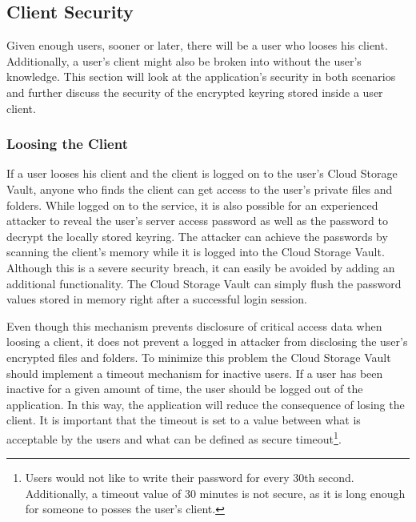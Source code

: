 \documentclass[pdftex,english,10pt,b5paper,twoside]{book}
\begin{document}
\subsection{Client Security}
Given enough users, sooner or later, there will be a user who looses his client.
Additionally, a user's client might also be broken into without the user's
knowledge. This section will look at the application's security in both
scenarios and further discuss the security of the encrypted keyring stored
inside a user client.

\subsubsection{Loosing the Client}
If a user looses his client and the client is logged on to the user's Cloud
Storage Vault, anyone who finds the client can get access to the user's private
files and folders. While logged on to the service, it is also possible for an
experienced attacker to reveal the user's server access password as well as the
password to decrypt the locally stored keyring. The attacker can achieve the passwords by
scanning the client's memory while it is logged into the Cloud Storage Vault.
Although this is a severe security breach, it can easily be avoided by adding an
additional functionality. The Cloud Storage Vault can simply flush the password
values stored in memory right after a successful login session.

Even though this mechanism prevents disclosure of critical access data when
loosing a client, it does not prevent a logged in attacker from disclosing the
user's encrypted files and folders. To minimize this problem the Cloud Storage Vault should implement a
timeout mechanism for inactive users. If a user has been inactive for a given
amount of time, the user should be logged out of the application. In this way,
the application will reduce the consequence of losing the client. It is
important that the timeout is set to a value between what is acceptable by the users
and what can be defined as secure timeout\footnote{Users would not like to write
their password for every 30th second. Additionally, a timeout value of 30 minutes is
not secure, as it is long enough for someone to posses the user's client.}.
\end{document}
